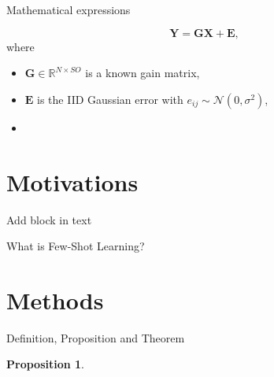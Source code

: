 \documentclass[10pt,hyperref={colorlinks,citecolor=blue,urlcolor=peking_blue,linkcolor=}]{beamer}
\theoremstyle{plain}
\newtheorem{proposition}{Proposition}
\begin{document}
\begin{frame}{Mathematical expressions}
    \lipsum[3][1-5]

    \lipsum[4][1-3]
    \begin{equation}\label{eq:1}
        \bm Y = \bm G \bm X + \bm E,
    \end{equation}
    where 
    \begin{itemize}
        \item $\bm G\in \mathbb{R}^{N\times SO}$ is a known gain matrix, 
        \item $\bm E$ is the IID Gaussian error with $e_{ij}\sim\mathcal{N}(0,\sigma^2)$, 
        \item \lipsum[2][1]
    \end{itemize}
\end{frame}

\section{Motivations}

\begin{frame}{Add block in text}
\lipsum[3][1-3]

\lipsum[3][1-2]

\lipsum[3][1-4]

\begin{block}{What is Few-Shot Learning?}
    \lipsum[3][1-4]
\end{block}
\end{frame}

\section{Methods}

\begin{frame}{Definition, Proposition and Theorem}

\begin{definition}
\lipsum[3][1-4]
\end{definition}

\begin{proposition}\label{prop:1}
\lipsum[3][5-8]
\end{proposition}

\begin{theorem}\label{theorem:generalization bound}
\lipsum[3][9-12]
\end{theorem}
    
\end{frame}
\end{document}
